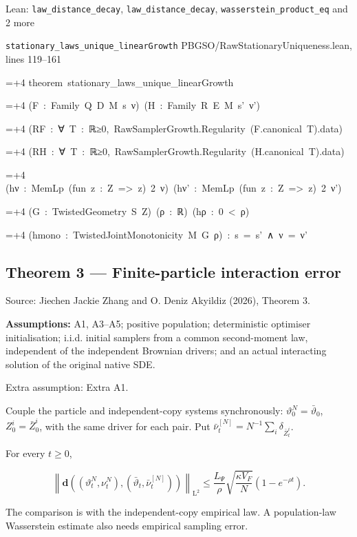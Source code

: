 \documentclass[11pt,a4paper]{report}
\newlength{\leancharwidth}
\newenvironment{leancode}{\par\smallskip\begingroup\ttfamily\footnotesize\raggedright
  \settowidth{\leancharwidth}{M}\setlength{\parskip}{0pt}\setlength{\parindent}{0pt}
  \frenchspacing}{\par\endgroup\smallskip}
\newcommand{\leanline}[2]{\hangindent=\dimexpr#1\leancharwidth+4\leancharwidth\relax
  \hangafter=1\noindent\hspace*{#1\leancharwidth}#2\par}
\newcommand{\leansource}[1]{\par{\footnotesize\color{leanmuted}#1}\par}
\begin{document}
\begin{leanbox}{Lean: \texttt{law\_\allowbreak{}distance\_\allowbreak{}decay}, \texttt{law\_\allowbreak{}distance\_\allowbreak{}decay}, \texttt{wasserstein\_\allowbreak{}product\_\allowbreak{}eq} and 2 more}
\leansource{\texttt{stationary\_\allowbreak{}laws\_\allowbreak{}unique\_\allowbreak{}linearGrowth} \quad PBGSO/\allowbreak{}RawStationaryUniqueness.lean, lines 119–161}
\begin{leancode}
\leanline{0}{theorem\ stationary\_laws\_unique\_linearGrowth}
\leanline{4}{(F\ :\ Family\ Q\ D\ M\ s\ ν)\ (H\ :\ Family\ R\ E\ M\ s'\ ν')}
\leanline{4}{(RF\ :\ ∀\ T\ :\ ℝ≥0,\ RawSamplerGrowth.Regularity\ (F.canonical\ T).data)}
\leanline{4}{(RH\ :\ ∀\ T\ :\ ℝ≥0,\ RawSamplerGrowth.Regularity\ (H.canonical\ T).data)}
\leanline{4}{(hν\ :\ MemLp\ (fun\ z\ :\ Z\ =>\ z)\ 2\ ν)\ (hν'\ :\ MemLp\ (fun\ z\ :\ Z\ =>\ z)\ 2\ ν')}
\leanline{4}{(G\ :\ TwistedGeometry\ S\ Z)\ (ρ\ :\ ℝ)\ (hρ\ :\ 0\ <\ ρ)}
\leanline{4}{(hmono\ :\ TwistedJointMonotonicity\ M\ G\ ρ)\ :\ s\ =\ s'\ ∧\ ν\ =\ ν'}
\end{leancode}
\end{leanbox}
\subsection{\texorpdfstring{Theorem 3 — Finite-particle interaction error}{Theorem 3 — Finite-particle interaction error}}


Source: Jiechen Jackie Zhang and O. Deniz Akyildiz (2026), Theorem 3.



\textbf{Assumptions:} A1, A3–A5; positive population; deterministic optimiser initialisation; i.i.d. initial samplers from a common second-moment law, independent of the independent Brownian drivers; and an actual interacting solution of the original native SDE.

Extra assumption: Extra A1.

Couple the particle and independent-copy systems synchronously: \(\vartheta_0^N=\bar\vartheta_0\), \(Z_0^i=\bar Z_0^i\), with the same driver for each pair. Put \(\bar\nu_t^{[N]}=N^{-1}\sum_i\delta_{\bar Z_t^i}\).





For every \(t\ge0\),





\[\left\|\mathbf d((\vartheta_t^N,\nu_t^N),(\bar\vartheta_t,\bar\nu_t^{[N]}))\right\|_{\mathrm L^2}\le\frac{L_\Psi}{\rho}\sqrt{\frac{\kappa V_F}{N}}(1-e^{-\rho t}).\]







The comparison is with the independent-copy empirical law. A population-law Wasserstein estimate also needs empirical sampling error.
\end{document}
